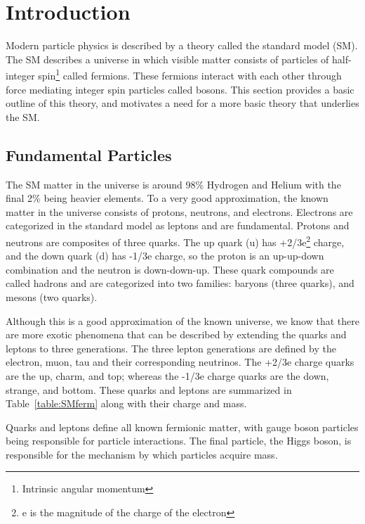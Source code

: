\chapter{Introduction}
\label{sec:intro}
Modern particle physics is described by a theory called the standard model (SM).  
The SM describes a universe in which visible matter consists of particles of half-integer spin\footnote{Intrinsic angular momentum} called fermions.  
These fermions interact with each other through force mediating integer spin particles called bosons.  
This section provides a basic outline of this theory, and motivates a need for a more basic theory that underlies the SM.

\section{Fundamental Particles}
The SM matter in the universe is around 98\% Hydrogen and Helium with the final 2\% being heavier elements.  
To a very good approximation, the known matter in the universe consists of protons, neutrons, and electrons.  
Electrons are categorized in the standard model as leptons and are fundamental.  
Protons and neutrons are composites of three quarks.  
The up quark (u) has +2/3e\footnote{e is the magnitude of the charge of the electron} charge, and the down quark (d) has -1/3e charge, so the proton is an up-up-down combination and the neutron is down-down-up.  
These quark compounds are called hadrons and are categorized into two families: baryons (three quarks), and mesons (two quarks).

Although this is a good approximation of the known universe, we know that there are 
more exotic phenomena that can be described by extending the quarks and leptons to three generations.  
The three lepton generations are defined by the electron, muon, tau and their corresponding neutrinos.
The +2/3e charge quarks are the up, charm, and top; whereas the -1/3e charge quarks are the down, strange, and bottom.  
These quarks and leptons are summarized in Table~\ref{table:SMferm} along with their charge and mass.
    
Quarks and leptons define all known fermionic matter, with gauge boson particles being responsible for particle interactions.  
The final particle, the Higgs boson, is responsible for the mechanism by which particles acquire mass.  
    

